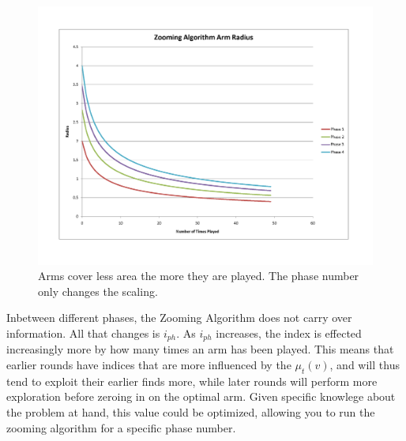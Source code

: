 \begin{figure}[!ht]
  \begin{center}
    \includegraphics[width=5 in]{figures/ZoomingRadius.png}
     \caption{Arms cover less area the more they are played. The phase number only changes the scaling.}
     \label{fig:zoomphase}
  \end{center}
\end{figure}

Inbetween different phases, the Zooming Algorithm does not carry
over information. All that changes is $i_{ph}$. As $i_{ph}$ increases,
the index is effected increasingly more by how many times an arm has
been played. This means that earlier rounds have indices that are more
influenced by the $\mu_t(v)$, and will thus tend to exploit their earlier
finds more, while later rounds will perform more exploration before zeroing
in on the optimal arm. Given specific knowlege about the problem at hand,
this value could be optimized, allowing you to run the zooming algorithm
for a specific phase number. 

